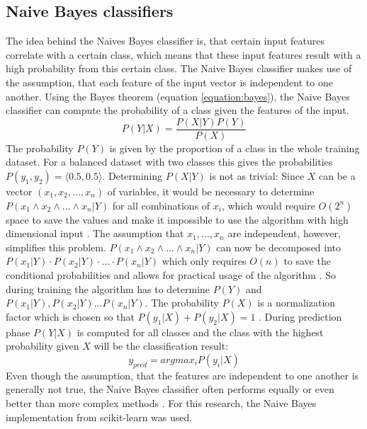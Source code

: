 \subsection{Naive Bayes classifiers}
The idea behind the Naives Bayes classifier is, that certain input features correlate with a certain class, which means that these input features result with a high probability from this certain class.
The Naive Bayes classifier makes use of the assumption, that each feature of the input vector is independent to one another.
Using the Bayes theorem (equation \ref{equation:bayes}), the Naive Bayes classifier can compute the probability of a class given the features of the input.
\begin{equation}
    P(Y|X) = \frac{P(X|Y)P(Y)}{P(X)}
    \label{equation:bayes}
\end{equation}
The probability $P(Y)$ is given by the proportion of a class in the whole training dataset.
For a balanced dataset with two classes this gives the probabilities $P(y_1, y_2)=\langle0.5,0.5\rangle$.
Determining $P(X|Y)$ is not as trivial:
Since $X$ can be a vector $(x_1, x_2, ..., x_n)$ of variables, it would be necessary to determine $P(x_1 \land x_2 \land ... \land x_n|Y)$ for all combinations of $x_i$, which would require $O(2^n)$ space to save the values and make it impossible to use the algorithm with high dimensional input \cite[p. 493]{Russel2016}.
The assumption that $x_1, ..., x_n$ are independent, however, simplifies this problem.
$P(x_1 \land x_2 \land ... \land x_n|Y)$ can now be decomposed into $P(x_1|Y)\cdot P(x_2|Y)\cdot...\cdot P(x_n|Y)$ which only requires $O(n)$ to save the conditional probabilities and allows for practical usage of the algorithm \cite[p. 499]{Russel2016}.
So during training the algorithm has to determine $P(Y)$ and $P(x_1|Y), P(x_2|Y) ... P(x_n|Y)$.
The probability $P(X)$ is a normalization factor which is chosen so that $P(y_1|X)+P(y_2|X)=1$ \cite[p. 493]{Russel2016}.
During prediction phase $P(Y|X)$ is computed for all classes and the class with the highest probability given $X$ will be the classification result:
\begin{equation}
    y_{pred} = arg max_i P(y_i|X)
\end{equation}
Even though the assumption, that the features are independent to one another is generally not true, the Naive Bayes classifier often performs equally or even better than more complex methods \cite[p. 211]{Hastie2009}.
For this research, the Naive Bayes implementation from scikit-learn was used.

